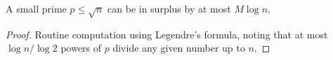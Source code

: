 \begin{sublemma}
\label{initial-factorization-small-prime-le}
\leanok
A small prime $p \leq \sqrt{n}$ can be in surplus by at most $M\log n$.
\end{sublemma}
\begin{proof}
\leanok
Routine computation using Legendre's formula, noting that at most
  $\log n / \log 2$ powers of $p$ divide any given number up to $n$.
\end{proof}
